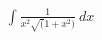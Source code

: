 \documentclass[preview]{standalone}
\begin{document}
\begin{align*}
\int \frac{1}{x^2\sqrt(1+x^2)} \ dx
\end{align*}
\end{document}

